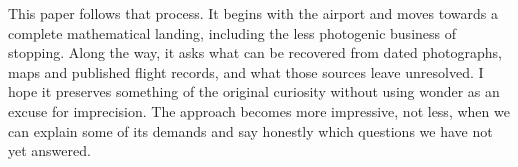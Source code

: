 This paper follows that process. It begins with the airport and moves towards a complete mathematical landing, including the less photogenic business of stopping. Along the way, it asks what can be recovered from dated photographs, maps and published flight records, and what those sources leave unresolved. I hope it preserves something of the original curiosity without using wonder as an excuse for imprecision. The approach becomes more impressive, not less, when we can explain some of its demands and say honestly which questions we have not yet answered.

\par{}
\par\medskip
